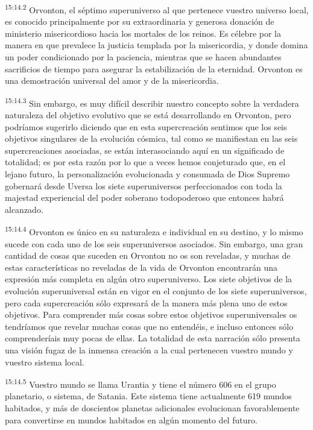 \par
\textsuperscript{15:14.2} Orvonton, el séptimo superuniverso al que pertenece vuestro universo local, es conocido principalmente por su extraordinaria y generosa donación de ministerio misericordioso hacia los mortales de los reinos. Es célebre por la manera en que prevalece la justicia templada por la misericordia, y donde domina un poder condicionado por la paciencia, mientras que se hacen abundantes sacrificios de tiempo para asegurar la estabilización de la eternidad. Orvonton es una demostración universal del amor y de la misericordia.

\par
\textsuperscript{15:14.3} Sin embargo, es muy difícil describir nuestro concepto sobre la verdadera naturaleza del objetivo evolutivo que se está desarrollando en Orvonton, pero podríamos sugerirlo diciendo que en esta supercreación sentimos que los seis objetivos singulares de la evolución cósmica, tal como se manifiestan en las seis supercreaciones asociadas, se están interasociando aquí en un significado de totalidad; es por esta razón por lo que a veces hemos conjeturado que, en el lejano futuro, la personalización evolucionada y consumada de Dios Supremo gobernará desde Uversa los siete superuniversos perfeccionados con toda la majestad experiencial del poder soberano todopoderoso que entonces habrá alcanzado.

\par
\textsuperscript{15:14.4} Orvonton es único en su naturaleza e individual en su destino, y lo mismo sucede con cada uno de los seis superuniversos asociados. Sin embargo, una gran cantidad de cosas que suceden en Orvonton no os son reveladas, y muchas de estas características no reveladas de la vida de Orvonton encontrarán una expresión más completa en algún otro superuniverso. Los siete objetivos de la evolución superuniversal están en vigor en el conjunto de los siete superuniversos, pero cada supercreación sólo expresará de la manera más plena uno de estos objetivos. Para comprender más cosas sobre estos objetivos superuniversales os tendríamos que revelar muchas cosas que no entendéis, e incluso entonces sólo comprenderíais muy pocas de ellas. La totalidad de esta narración sólo presenta una visión fugaz de la inmensa creación a la cual pertenecen vuestro mundo y vuestro sistema local.

\par
\textsuperscript{15:14.5} Vuestro mundo se llama Urantia y tiene el número 606 en el grupo planetario, o sistema, de Satania. Este sistema tiene actualmente 619 mundos habitados, y más de doscientos planetas adicionales evolucionan favorablemente para convertirse en mundos habitados en algún momento del futuro.

